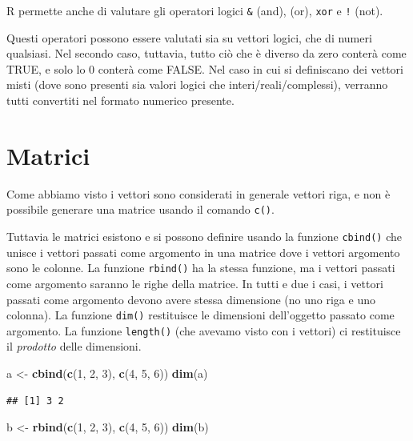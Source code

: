 \documentclass[]{book}
\newenvironment{Shaded}{\begin{snugshade}}{\end{snugshade}}
\newcommand{\DecValTok}[1]{\textcolor[rgb]{0.00,0.00,0.81}{#1}}
\newcommand{\KeywordTok}[1]{\textcolor[rgb]{0.13,0.29,0.53}{\textbf{#1}}}
\newcommand{\NormalTok}[1]{#1}
\newcommand{\StringTok}[1]{\textcolor[rgb]{0.31,0.60,0.02}{#1}}
\begin{document}
R permette anche di valutare gli operatori logici \texttt{\&} (and), \texttt{\textbar{}} (or), \texttt{xor} e \texttt{!} (not).

Questi operatori possono essere valutati sia su vettori logici, che di numeri qualsiasi. Nel secondo caso, tuttavia, tutto ciò che è diverso da zero conterà come TRUE, e solo lo 0 conterà come FALSE. Nel caso in cui si definiscano dei vettori misti (dove sono presenti sia valori logici che interi/reali/complessi), verranno tutti convertiti nel formato numerico presente.

\hypertarget{matrici}{%
\section{Matrici}\label{matrici}}

Come abbiamo visto i vettori sono considerati in generale vettori riga, e non è possibile generare una matrice usando il comando \texttt{c()}.

Tuttavia le matrici esistono e si possono definire usando la funzione \texttt{cbind()} che unisce i vettori passati come argomento in una matrice dove i vettori argomento sono le colonne. La funzione \texttt{rbind()} ha la stessa funzione, ma i vettori passati come argomento saranno le righe della matrice. In tutti e due i casi, i vettori passati come argomento devono avere stessa dimensione (no uno riga e uno colonna). La funzione \texttt{dim()} restituisce le dimensioni dell'oggetto passato come argomento. La funzione \texttt{length()} (che avevamo visto con i vettori) ci restituisce il \emph{prodotto} delle dimensioni.

\begin{Shaded}
\begin{Highlighting}[]
\NormalTok{a <-}\StringTok{ }\KeywordTok{cbind}\NormalTok{(}\KeywordTok{c}\NormalTok{(}\DecValTok{1}\NormalTok{, }\DecValTok{2}\NormalTok{, }\DecValTok{3}\NormalTok{), }\KeywordTok{c}\NormalTok{(}\DecValTok{4}\NormalTok{, }\DecValTok{5}\NormalTok{, }\DecValTok{6}\NormalTok{))}
\KeywordTok{dim}\NormalTok{(a)}
\end{Highlighting}
\end{Shaded}

\begin{verbatim}
## [1] 3 2
\end{verbatim}

\begin{Shaded}
\begin{Highlighting}[]
\NormalTok{b <-}\StringTok{ }\KeywordTok{rbind}\NormalTok{(}\KeywordTok{c}\NormalTok{(}\DecValTok{1}\NormalTok{, }\DecValTok{2}\NormalTok{, }\DecValTok{3}\NormalTok{), }\KeywordTok{c}\NormalTok{(}\DecValTok{4}\NormalTok{, }\DecValTok{5}\NormalTok{, }\DecValTok{6}\NormalTok{))}
\KeywordTok{dim}\NormalTok{(b)}
\end{Highlighting}
\end{Shaded}
\end{document}
